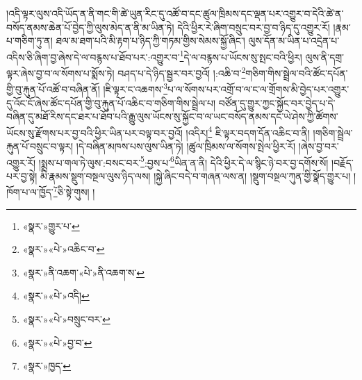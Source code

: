 །འདི་ལྟར་ལུས་འདི་ཡོད་ན་ནི་གང་གི་ཚེ་ཡུན་རིང་དུ་འཚོ་བ་དང་ཚུལ་ཁྲིམས་དང་ལྡན་པར་འགྱུར་བ་དེའི་ཚེ་ན་བསོད་ནམས་ཆེན་པོ་བྱེད་ཀྱི་ལུས་མེད་ན་ནི་མ་ཡིན་ཏེ། དེའི་ཕྱིར་རེ་ཞིག་བསྲུང་བར་བྱ་བ་ཉིད་དུ་འགྱུར་རོ། །རྣམ་པ་གཅིག་ཏུ་ན། ཐལ་མ་ཐག་པའི་མི་རྟག་པ་ཉིད་ཀྱི་གཏམ་གྱིས་སེམས་སྐྱོ་ཞིང་། ལུས་དོན་མ་ཡིན་པ་འདྲེན་པ་འདིས་ཅི་ཞིག་བྱ་ཞེས་དེ་ལ་བརྙས་པ་ཐོབ་པར་:འགྱུར་བ་\footnote{«སྣར་»གྱུར་པ་}དེ་ལ་བརྙས་པ་ཡོངས་སུ་སྤང་བའི་ཕྱིར། ལུས་ནི་དགྲ་ལྟར་ཞེས་བྱ་བ་ལ་སོགས་པ་སྨོས་ཏེ། བཤད་པ་དེ་ཉིད་སྦྱར་བར་བྱའོ། །:འཆི་བ་\footnote{«སྣར་»«པེ་»འཆིང་བ་}གཅིག་གིས་སྦྲེལ་བའི་ཚོང་དཔོན་གྱི་བུ་རྐུན་པོ་འཚོ་བ་བཞིན་ནོ། །ཇི་ལྟར་ང་འཆགས་\footnote{«སྣར་»ནི་འཆག་«པེ་»ནི་འཆག་ས་}པ་ལ་སོགས་པར་འགྲོ་བ་ལ་ང་ལ་གྲོགས་མི་བྱེད་པར་འགྱུར་དུ་འོང་ངོ་ཞེས་ཚོང་དཔོན་གྱི་བུ་རྐུན་པོ་འཆིང་བ་གཅིག་གིས་སྦྲེལ་པ། བཙོན་དུ་གྱུར་ཀྱང་སྐྱོང་བར་བྱེད་པ་དེ་བཞིན་དུ་མཐོ་རིས་དང་ཐར་པ་ཐོབ་པའི་རྒྱུ་ལུས་ཡོངས་སུ་སྐྱོང་བ་ལ་ཡང་བསོད་ནམས་དང་ཡེ་ཤེས་ཀྱི་ཚོགས་ཡོངས་སུ་རྫོགས་པར་བྱ་བའི་ཕྱིར་ཡིན་པར་བལྟ་བར་བྱའོ། །འདིར།\footnote{«སྣར་»«པེ་»འདི།} ཇི་ལྟར་བདག་དོན་འཆིང་བ་ནི། །གཅིག་སྦྲེལ་རྐུན་པོ་བསྲུང་བ་ལྟར། །དེ་བཞིན་མཁས་པས་ལུས་ཡིན་ཏེ། །ཚུལ་ཁྲིམས་ལ་སོགས་སྤེལ་ཕྱིར་རོ། །ཞེས་བྱ་བར་འགྱུར་རོ། །སྨྲས་པ་གལ་ཏེ་ལུས་:བསང་བར་\footnote{«སྣར་»«པེ་»བསྲུང་བར་}:བྱས་པ་\footnote{«སྣར་»«པེ་»བྱ་བ་}ཡིན་ན་ནི། དེའི་ཕྱིར་དེ་ལ་སྙིང་ཉེ་བར་བྱ་དགོས་སོ། །བརྗོད་པར་བྱ་སྟེ། མི་རྣམས་སྡུག་བསྔལ་ལུས་ཉིད་ལས། །སྐྱེ་ཞིང་བདེ་བ་གཞན་ལས་ན། །སྡུག་བསྔལ་ཀུན་གྱི་སྣོད་གྱུར་པ། །ཁོག་པ་ལ་ཁྱོད་\footnote{«སྣར་»ཁྱད་}ཅི་སྟེ་གུས། །
